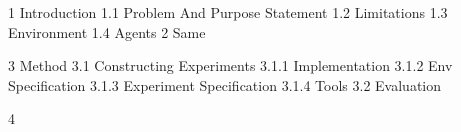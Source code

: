 1 Introduction
1.1 Problem And Purpose Statement
1.2 Limitations
1.3 Environment
1.4 Agents
2 Same

3 Method
3.1 Constructing Experiments
3.1.1 Implementation
3.1.2 Env Specification
3.1.3 Experiment Specification
3.1.4 Tools
3.2 Evaluation

4 